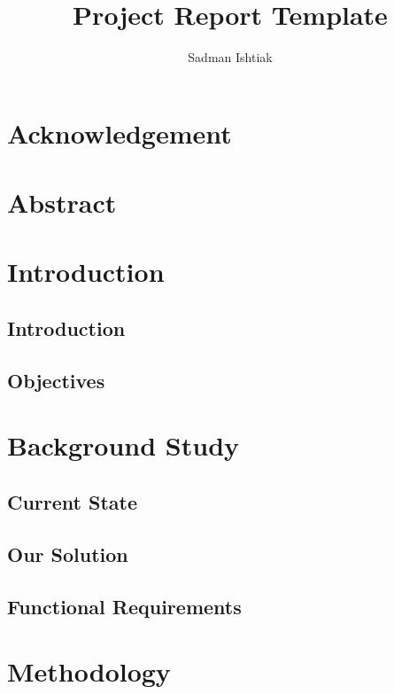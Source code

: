 \documentclass[a4paper, 12pt, openany]{report}
\title{Project Report Template}
\author{Sadman Ishtiak}
\begin{document}
	\let\cleardoublepage\clearpage
	\maketitle
	
	\setcounter{secnumdepth}{1}
	\setcounter{tocdepth}{1}
	\tableofcontents
	
	\clearpage

	
	\chapter*{Acknowledgement}
	
	\chapter*{Abstract}
	
	\chapter{Introduction}
	\section{Introduction}
	\section{Objectives}
	
	\chapter{Background Study}
	\section{Current State}
	\section{Our Solution}
	\section{Functional Requirements}
	
	\chapter{Methodology}
\end{document}
